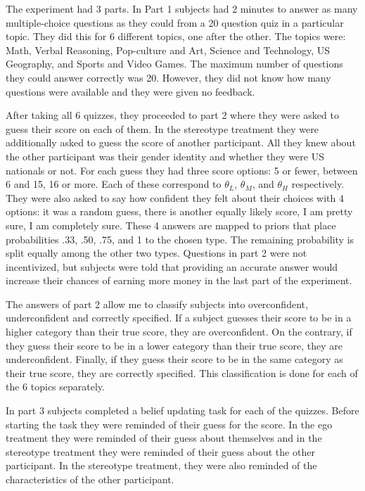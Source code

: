 \documentclass[
  12pt,
]{article}
\begin{document}
The experiment had 3 parts. In Part 1 subjects had 2 minutes to answer
as many multiple-choice questions as they could from a 20 question quiz
in a particular topic. They did this for 6 different topics, one after
the other. The topics were: Math, Verbal Reasoning, Pop-culture and Art,
Science and Technology, US Geography, and Sports and Video Games. The
maximum number of questions they could answer correctly was 20. However,
they did not know how many questions were available and they were given
no feedback.

After taking all 6 quizzes, they proceeded to part 2 where they were
asked to guess their score on each of them. In the stereotype treatment
they were additionally asked to guess the score of another participant.
All they knew about the other participant was their gender identity and
whether they were US nationals or not. For each guess they had three
score options: 5 or fewer, between 6 and 15, 16 or more. Each of these
correspond to \(\theta_L\), \(\theta_M\), and \(\theta_H\) respectively.
They were also asked to say how confident they felt about their choices
with 4 options: it was a random guess, there is another equally likely
score, I am pretty sure, I am completely sure. These 4 answers are
mapped to priors that place probabilities .33, .50, .75, and 1 to the
chosen type. The remaining probability is split equally among the other
two types. Questions in part 2 were not incentivized, but subjects were
told that providing an accurate answer would increase their chances of
earning more money in the last part of the experiment.

The answers of part 2 allow me to classify subjects into overconfident,
underconfident and correctly specified. If a subject guesses their score
to be in a higher category than their true score, they are
overconfident. On the contrary, if they guess their score to be in a
lower category than their true score, they are underconfident. Finally,
if they guess their score to be in the same category as their true
score, they are correctly specified. This classification is done for
each of the 6 topics separately.

In part 3 subjects completed a belief updating task for each of the
quizzes. Before starting the task they were reminded of their guess for
the score. In the ego treatment they were reminded of their guess about
themselves and in the stereotype treatment they were reminded of their
guess about the other participant. In the stereotype treatment, they
were also reminded of the characteristics of the other participant.
\end{document}

